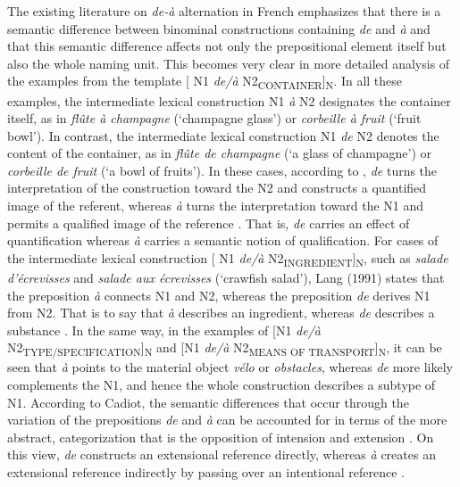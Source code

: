 \documentclass[output=paper]{langsci/langscibook}
\begin{document}
The existing literature on \textit{de-à} alternation in French emphasizes that there is a semantic difference between binominal constructions containing \textit{de} and \textit{à} and that this semantic difference affects not only the prepositional element itself but also the whole naming unit. This becomes very clear in more detailed analysis of the examples from the template [ N1 \textit{de/à} N2\textsubscript{CONTAINER}]\textsubscript{N}. In all these examples, the intermediate lexical construction N1 \textit{à} N2 designates the container itself, as in \textit{flûte à champagne} (`champagne glass') or \textit{corbeille à fruit} (`fruit bowl'). In contrast, the intermediate lexical construction N1 \textit{de} N2 denotes the content of the container, as in \textit{flûte de champagne} (`a glass of champagne') or \textit{corbeille de fruit} (`a bowl of fruits'). In these cases, according to \citet{Cadiot:1997}, \textit{de} turns the interpretation of the construction toward the N2 and constructs a quantified image of the referent, whereas \textit{à} turns the interpretation toward the N1 and permits a qualified image of the reference \citep[44]{Cadiot:1997}. That is, \textit{de} carries an effect of quantification whereas \textit{à} carries a semantic notion of qualification. For cases of the intermediate lexical construction [ N1 \textit{de/à} N2\textsubscript{INGREDIENT}]\textsubscript{N}, such as \textit{salade d’écrevisses} and \textit{salade aux écrevisses} (`crawfish salad'), Lang (1991) states that the preposition \textit{à} connects N1 and N2, whereas the preposition \textit{de} derives N1 from N2. That is to say that \textit{à} describes an ingredient, whereas \textit{de} describes a substance \citep[283]{Lang:1991}. In the same way, in the examples of [N1 \textit{de/à} N2\textsubscript{TYPE/SPECIFICATION}]\textsubscript{N} and [N1 \textit{de/à} N2\textsubscript{MEANS OF TRANSPORT}]\textsubscript{N}, it can be seen that \textit{à} points to the material object \textit{vélo} or \textit{obstacles}, whereas  \textit{de} more likely complements the N1, and hence the whole construction describes a subtype of N1. According to Cadiot, the semantic differences that occur through the variation of the prepositions \textit{de} and \textit{à} can be accounted for in terms of the more abstract, categorization that is the opposition of intension and extension \citep[43]{Cadiot:1997}. On this view, \textit{de} constructs an extensional reference  directly, whereas \textit{à} creates an extensional reference  indirectly by passing over an intentional reference \citep[62]{Cadiot:1997}. \\
\end{document}
